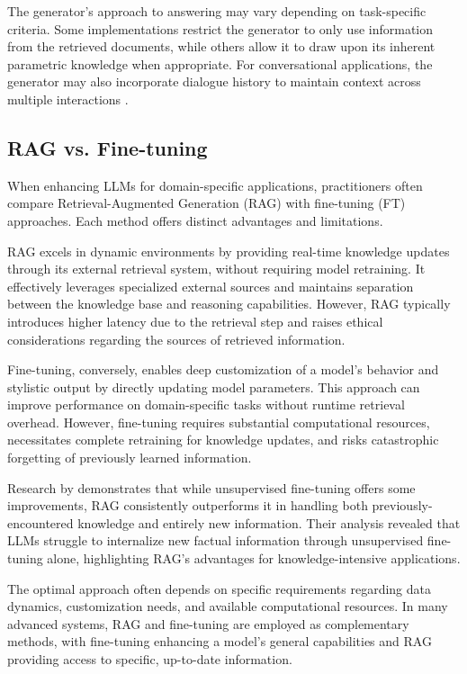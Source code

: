 The generator's approach to answering may vary depending on task-specific criteria. Some implementations restrict the generator to only use information from the retrieved documents, while others allow it to draw upon its inherent parametric knowledge when appropriate. For conversational applications, the generator may also incorporate dialogue history to maintain context across multiple interactions \citep{gao2024retrievalaugmentedgenerationlargelanguage}.

\subsection{RAG vs. Fine-tuning}
When enhancing LLMs for domain-specific applications, practitioners often compare Retrieval-Augmented Generation (RAG) with fine-tuning (FT) approaches. Each method offers distinct advantages and limitations.

RAG excels in dynamic environments by providing real-time knowledge updates through its external retrieval system, without requiring model retraining. It effectively leverages specialized external sources and maintains separation between the knowledge base and reasoning capabilities. However, RAG typically introduces higher latency due to the retrieval step and raises ethical considerations regarding the sources of retrieved information.

Fine-tuning, conversely, enables deep customization of a model's behavior and stylistic output by directly updating model parameters. This approach can improve performance on domain-specific tasks without runtime retrieval overhead. However, fine-tuning requires substantial computational resources, necessitates complete retraining for knowledge updates, and risks catastrophic forgetting of previously learned information.

Research by \cite{ovadia2024finetuningretrievalcomparingknowledge} demonstrates that while unsupervised fine-tuning offers some improvements, RAG consistently outperforms it in handling both previously-encountered knowledge and entirely new information. Their analysis revealed that LLMs struggle to internalize new factual information through unsupervised fine-tuning alone, highlighting RAG's advantages for knowledge-intensive applications.

The optimal approach often depends on specific requirements regarding data dynamics, customization needs, and available computational resources. In many advanced systems, RAG and fine-tuning are employed as complementary methods, with fine-tuning enhancing a model's general capabilities and RAG providing access to specific, up-to-date information.

